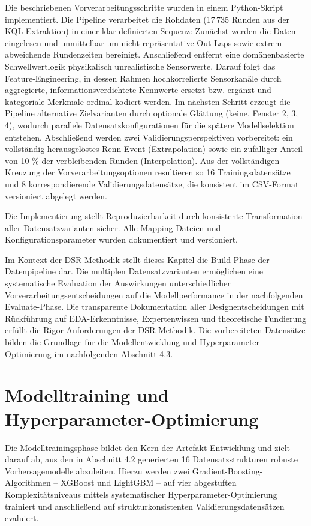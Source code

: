 Die beschriebenen Vorverarbeitungsschritte wurden in einem Python-Skript implementiert. Die Pipeline verarbeitet die Rohdaten (17\,735 Runden aus der KQL-Extraktion) in einer klar definierten Sequenz: Zunächst werden die Daten eingelesen und unmittelbar um nicht-repräsentative Out-Laps sowie extrem abweichende Rundenzeiten bereinigt. Anschließend entfernt eine domänenbasierte Schwellwertlogik physikalisch unrealistische Sensorwerte. Darauf folgt das Feature-Engineering, in dessen Rahmen hochkorrelierte Sensorkanäle durch aggregierte, informationsverdichtete Kennwerte ersetzt bzw. ergänzt und kategoriale Merkmale ordinal kodiert werden. Im nächsten Schritt erzeugt die Pipeline alternative Zielvarianten durch optionale Glättung (keine, Fenster 2, 3, 4), wodurch parallele Datensatzkonfigurationen für die spätere Modellselektion entstehen. Abschließend werden zwei Validierungsperspektiven vorbereitet: ein vollständig herausgelöstes Renn-Event (Extrapolation) sowie ein zufälliger Anteil von 10 \% der verbleibenden Runden (Interpolation). Aus der vollständigen Kreuzung der Vorverarbeitungsoptionen resultieren so 16 Trainingsdatensätze und 8 korrespondierende Validierungsdatensätze, die konsistent im CSV-Format versioniert abgelegt werden.

Die Implementierung stellt Reproduzierbarkeit durch konsistente Transformation aller Datensatzvarianten sicher. Alle Mapping-Dateien und Konfigurationsparameter wurden dokumentiert und versioniert.

Im Kontext der \ac{DSR}-Methodik stellt dieses Kapitel die Build-Phase der Datenpipeline dar. Die multiplen Datensatzvarianten ermöglichen eine systematische Evaluation der Auswirkungen unterschiedlicher Vorverarbeitungsentscheidungen auf die Modellperformance in der nachfolgenden Evaluate-Phase. Die transparente Dokumentation aller Designentscheidungen mit Rückführung auf EDA-Erkenntnisse, Expertenwissen und theoretische Fundierung erfüllt die Rigor-Anforderungen der \ac{DSR}-Methodik.
Die vorbereiteten Datensätze bilden die Grundlage für die Modellentwicklung und Hyperparameter-Optimierung im nachfolgenden Abschnitt 4.3.



\section{Modelltraining und Hyperparameter-Optimierung}

Die Modelltrainingsphase bildet den Kern der Artefakt-Entwicklung und zielt darauf ab, aus den in Abschnitt 4.2 generierten 16 Datensatzstrukturen robuste Vorhersagemodelle abzuleiten. Hierzu werden zwei Gradient-Boosting-Algorithmen – XGBoost und LightGBM – auf vier abgestuften Komplexitätsniveaus mittels systematischer Hyperparameter-Optimierung trainiert und anschließend auf strukturkonsistenten Validierungsdatensätzen evaluiert.

